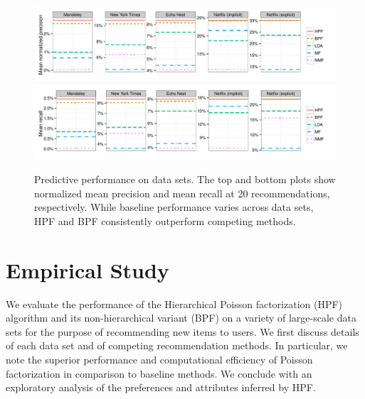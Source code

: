 \begin{figure}[t!]
\centering
\includegraphics[width=\textwidth]{figures/mean_precision_at_20.pdf}\\
\includegraphics[width=\textwidth]{figures/mean_recall_at_20.pdf}\\
\caption{Predictive performance on data sets. The top and bottom plots
  show normalized mean precision and mean recall at 20
  recommendations, respectively. While baseline performance varies
  across data sets, HPF and BPF consistently outperform competing
  methods.}
\label{fig:precision_recall}
\end{figure}


\section{Empirical Study}
\label{sec:eval}
We evaluate the performance of the Hierarchical Poisson factorization
(HPF) algorithm and its non-hierarchical variant (BPF) on a variety of
large-scale data sets for the purpose of recommending new items to
users. We first discuss details of each data set and of competing
recommendation methods. In particular, we note the superior
performance and computational efficiency of Poisson factorization in
comparison to baseline methods. We conclude with an exploratory
analysis of the preferences and attributes inferred by HPF.

